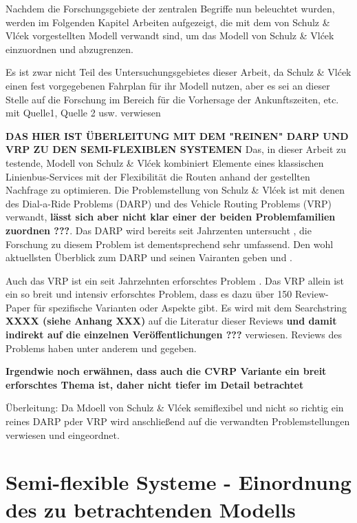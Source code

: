 Nachdem die Forschungsgebiete der zentralen Begriffe nun beleuchtet wurden, werden im Folgenden Kapitel Arbeiten aufgezeigt, die mit dem von Schulz \& Vlćek vorgestellten Modell verwandt sind, um das Modell von Schulz \& Vlćek einzuordnen und abzugrenzen.

Es ist zwar nicht Teil des Untersuchungsgebietes dieser Arbeit, da Schulz \& Vlćek einen fest vorgegebenen Fahrplan für ihr Modell nutzen, aber es sei an dieser Stelle auf die Forschung im Bereich für die Vorhersage der Ankunftszeiten, etc. mit Quelle1, Quelle 2 usw. verwiesen

\textbf{DAS HIER IST ÜBERLEITUNG MIT DEM "REINEN" DARP UND VRP ZU DEN SEMI-FLEXIBLEN SYSTEMEN}
Das, in dieser Arbeit zu testende, Modell von Schulz \& Vlćek kombiniert Elemente eines klassischen Linienbus-Services mit der Flexibilität die Routen anhand der gestellten Nachfrage zu optimieren. Die Problemstellung von Schulz \& Vlćek ist mit denen des Dial-a-Ride Problems (DARP) und des Vehicle Routing Problems (VRP) verwandt, \textbf{lässt sich aber nicht klar einer der beiden Problemfamilien zuordnen ???}. Das DARP wird bereits seit Jahrzenten untersucht \parencite{psaraftis_dynamic_1980}, die Forschung zu diesem Problem ist dementsprechend sehr umfassend. Den wohl aktuellsten Überblick zum DARP und seinen Vairanten geben \textcite{molenbruch_typology_2017} und \textcite{ho_survey_2018}. 

Auch das VRP ist ein seit Jahrzehnten erforschtes Problem \parencite{orloff_fundamental_1974}. Das VRP allein ist ein so breit und intensiv erforschtes Problem, dass es dazu über 150 Review-Paper für spezifische Varianten oder Aspekte gibt. Es wird mit dem Searchstring \textbf{XXXX (siehe Anhang XXX)} auf die Literatur dieser Reviews \textbf{und damit indirekt auf die einzelnen Veröffentlichungen ???} verwiesen. Reviews des Problems haben unter anderem \textcite{braekers_vehicle_2016} und \textcite{vidal_concise_2020} gegeben. 

\textbf{Irgendwie noch erwähnen, dass auch die CVRP Variante ein breit erforschtes Thema ist, daher nicht tiefer im Detail betrachtet}

Überleitung: Da Mdoell von Schulz \& Vlćek semiflexibel und nicht so richtig ein reines DARP pder VRP wird anschließend auf die verwandten Problemstellungen verwiesen und eingeordnet.

\newpage
\section{Semi-flexible Systeme - Einordnung des zu betrachtenden Modells}
\label{sec:Einordnung}
\label{sec:2.2}

